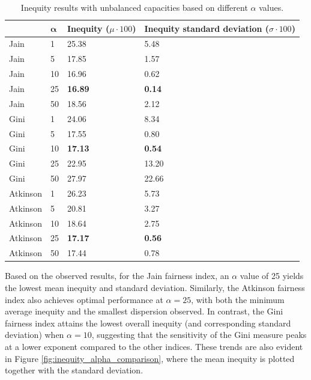 \documentclass[preprint,12pt]{elsarticle}
\begin{document}
\begin{table}[htbp]
\centering
\begin{adjustbox}{max width=\textwidth}
\begin{tabular}{|l|C{30pt}|C{80pt}|C{120pt}|}
\hline
{} & $\boldsymbol{\alpha} $ & \textbf{Inequity} ($ \mu \cdot 100 $) & \textbf{Inequity standard deviation} ($ \sigma \cdot 100 $) \\
\hline \hline
Jain     & 1  & 25.38 & 5.48 \\ \hline
Jain     & 5  & 17.85 & 1.57 \\ \hline
Jain     & 10 & 16.96 & 0.62 \\ \hline
Jain     & 25 & \textbf{16.89} & \textbf{0.14} \\ \hline
Jain     & 50 & 18.56 & 2.12 \\ \hline \hline
Gini     & 1  & 24.06 & 8.34 \\ \hline
Gini     & 5  & 17.55 & 0.80 \\ \hline
Gini     & 10 & \textbf{17.13} & \textbf{0.54} \\ \hline
Gini     & 25 & 22.95 & 13.20 \\ \hline
Gini     & 50 & 27.97 & 22.66 \\ \hline \hline
Atkinson & 1  & 26.23 & 5.73 \\ \hline
Atkinson & 5  & 20.81 & 3.27 \\ \hline
Atkinson & 10 & 18.64 & 2.75 \\ \hline
Atkinson & 25 & \textbf{17.17} & \textbf{0.56} \\ \hline
Atkinson & 50 & 17.44 & 0.78 \\ \hline
\end{tabular}
\end{adjustbox}
\caption{Inequity results with unbalanced capacities based on different $\alpha$ values.}
\label{tab:inequity_summary_alpha}
\end{table}

Based on the observed results, for the Jain fairness index, an $\alpha$ value of 25 yields the lowest mean inequity and standard deviation. Similarly, the Atkinson fairness index also achieves optimal performance at $\alpha=25$, with both the minimum average inequity and the smallest dispersion observed. In contrast, the Gini fairness index attains the lowest overall inequity (and corresponding standard deviation) when $\alpha=10$, suggesting that the sensitivity of the Gini measure peaks at a lower exponent compared to the other indices. These trends are also evident in Figure \ref{fig:inequity_alpha_comparison}, where the mean inequity is plotted together with the standard deviation. 
\end{document}
